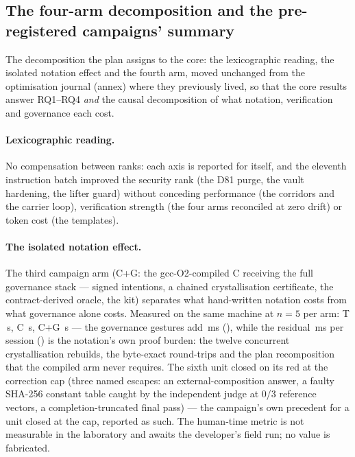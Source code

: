 \documentclass[10pt,a4paper]{article}
\begin{document}
\subsection{The four-arm decomposition and the pre-registered campaigns' summary}\label{sec:quatrebras}
The decomposition the plan assigns to the core: the lexicographic
reading, the isolated notation effect and the fourth arm, moved
unchanged from the optimisation journal (annex) where they previously
lived, so that the core results answer RQ1--RQ4 \emph{and} the causal
decomposition of what notation, verification and governance each cost.

\paragraph{Lexicographic reading.} No compensation between ranks: each
axis is reported for itself, and the eleventh instruction batch
improved the security rank (the D81 purge, the vault hardening, the
lifter guard) without conceding performance (the corridors and the
carrier loop), verification strength (the four arms reconciled at
zero drift) or token cost (the templates).

\paragraph{The isolated notation effect.} The third campaign arm
(C+G: the gcc-O2-compiled C receiving the full governance stack ---
signed intentions, a chained crystallisation certificate, the
contract-derived oracle, the kit) separates what hand-written
notation costs from what governance alone costs. Measured on the same
machine at $n{=}5$ per arm: T \cgMquatreT{}\,s, C \cgMquatreC{}\,s,
C+G \cgMquatreCG{}\,s --- the governance gestures add
\cgEffetGouvernanceMs{}\,ms (\cgEffetGouvernanceRatio{}), while the
residual \cgEffetNotationMs{}\,ms per session
(\cgEffetNotationRatio{}) is the notation's own proof burden: the
twelve concurrent crystallisation rebuilds, the byte-exact
round-trips and the plan recomposition that the compiled arm never
requires. The sixth unit closed on its red at the correction cap
(three named escapes: an external-composition answer, a faulty
SHA-256 constant table caught by the independent judge at 0/3
reference vectors, a completion-truncated final pass) --- the
campaign's own precedent for a unit closed at the cap, reported as
such. The human-time metric is not measurable in the laboratory and
awaits the developer's field run; no value is fabricated.
\end{document}
